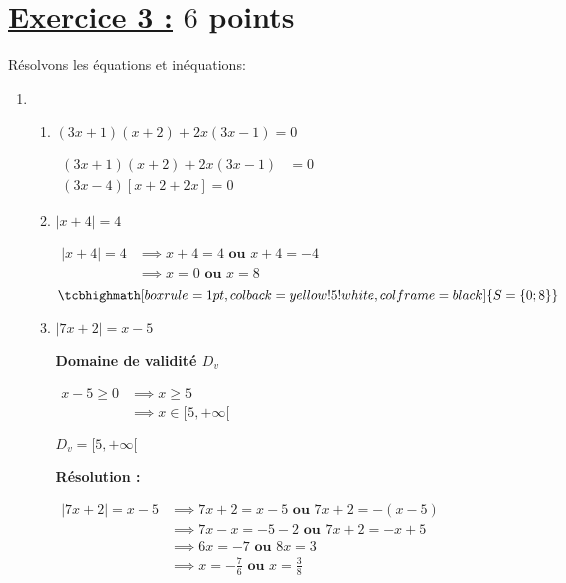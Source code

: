 \documentclass[12pt,a4paper]{article}
\begin{document}
\section*{\underline{Exercice 3 :} $6$ points}

Résolvons les équations et inéquations:

\begin{enumerate}
    \item[]
    \begin{enumerate}
        \item $ (3x + 1)(x + 2) + 2x(3x - 1) = 0 $

            $
    \begin{aligned}
            (3x + 1)(x + 2) + 2x(3x - 1) &= 0\\
            (3x - 4) \left[x + 2 + 2x\right] = 0
    \end{aligned}
    $
         \item \( |x + 4| = 4 \)

    \(
        \begin{aligned}
            |x + 4| = 4 &\implies x+4 = 4 \textbf{ ou } x+4 = -4\\
                        &\implies x = 0 \textbf{ ou } x = 8            
        \end{aligned}
    \)
\[
\tcbhighmath[boxrule=1pt, colback=yellow!5!white, colframe=black]{S=
\left\{0;8\right\}
}
\]
         \item \( |7x + 2| = x - 5 \)

         \textbf{Domaine de validité \(D_v\)}  

        \(  
            \begin{aligned}
                x - 5 \geq 0 &\implies x \geq 5\\
                             &\implies x\in [5, +\infty[
            \end{aligned}
        \)
        
 \(  D_v = [5, +\infty[ \)

\textbf{Résolution :}

\( 
\begin{aligned}
    |7x + 2| = x - 5 &\implies 7x + 2 = x - 5 \textbf{ ou } 7x + 2 = -(x - 5)\\
                     &\implies 7x - x = -5 - 2 \textbf{ ou }  7x + 2 = -x + 5\\
                     &\implies 6x = -7 \textbf{ ou } 8x = 3 \\
                     &\implies x = -\frac{7}{6} \textbf{ ou } x = \frac{3}{8}
\end{aligned}
\)


\end{enumerate}
\end{enumerate}
\end{document}
